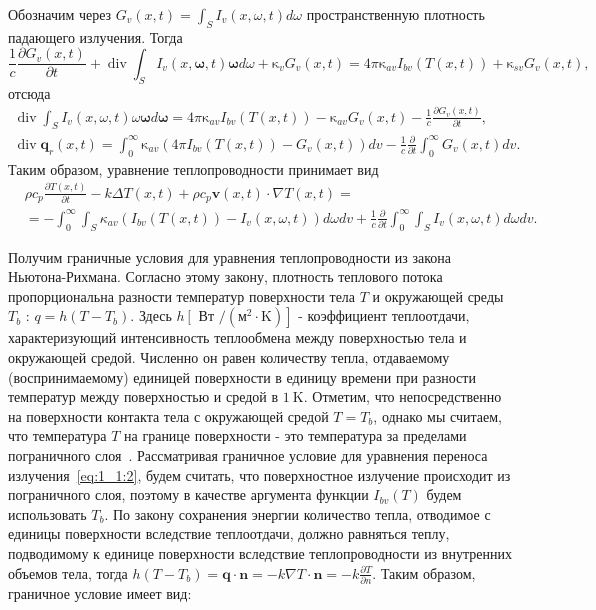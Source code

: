 Обозначим через $G_{v}(x, t)=\int_{S} I_{v}(x, \omega, t) d \omega$
пространственную плотность падающего излучения.
Тогда
\[
    \frac{1}{c} \frac{\partial G_{v}(x, t)}{\partial t}
    +\operatorname{div} \int_{S} I_{v}(x, \boldsymbol{\omega}, t)
    \boldsymbol{\omega} d \omega+\mathrm{\kappa}_{v} G_{v}(x, t)=4 \pi
    \mathrm{\kappa}_{a v} I_{b v}(T(x, t))+\mathrm{\kappa}_{s v} G_{v}(x, t),
\]
отсюда
\[
    \begin{gathered}
        \operatorname{div} \int_{S} I_{v}(x, \omega, t) \omega \boldsymbol{\omega} d
        \boldsymbol{\omega}=4 \pi \mathrm{\kappa}_{a v} I_{b v}(T(x, t))-\mathrm{\kappa}_{a v}
        G_{v}(x, t)-\frac{1}{c} \frac{\partial G_{v}(x, t)}{\partial t}, \\
        \operatorname{div} \mathbf{q}_{r}(x, t)=\int_{0}^{\infty} \mathrm{\kappa}_{a v}
        \left(4 \pi I_{b v}(T(x, t))-G_{v}(x, t)\right) d v-\frac{1}{c}
        \frac{\partial}{\partial t} \int_{0}^{\infty} G_{v}(x, t) d v.
    \end{gathered}
\]
Таким образом, уравнение теплопроводности принимает вид
\[
    \begin{aligned}
        &\rho c_{p} \frac{\partial T(x, t)}{\partial t}
        -k \Delta T(x, t)+\rho c_{p} \mathbf{v}(x, t) \cdot \nabla T(x, t)= \\
        &=-\int_{0}^{\infty} \int_{S} \kappa_{a v}
        \left(I_{b v}(T(x, t))-I_{v}(x, \omega, t)\right) d \omega d v
        +\frac{1}{c} \frac{\partial}{\partial t}
        \int_{0}^{\infty} \int_{S} I_{v}(x, \omega, t) d \omega d v.
    \end{aligned}
\]

Получим граничные условия для уравнения теплопроводности из закона Ньютона-Рихмана.
Согласно этому закону, плотность теплового потока пропорциональна разности температур
поверхности тела $T$ и окружающей среды $T_{b}$ : $q=h\left(T-T_{b}\right)$.
Здесь $h\left[\right.$ Вт $\left./\left(\mathrm{м}^{2} \cdot \mathrm{K}\right)\right]$ - коэффициент
теплоотдачи, характеризующий интенсивность теплообмена между поверхностью тела и окружающей средой.
Численно он равен количеству тепла, отдаваемому (воспринимаемому) единицей поверхности в единицу времени
при разности температур между поверхностью и средой в $1 \mathrm{~K}$.
Отметим, что непосредственно
на поверхности контакта тела с окружающей средой $T=T_{b}$,
однако мы считаем, что температура $T$ на
границе поверхности - это температура за пределами пограничного слоя~\cite{Mazo}.
Рассматривая граничное условие для уравнения переноса излучения~\eqref{eq:1_1:2},
будем считать, что поверхностное излучение происходит из пограничного слоя,
поэтому в качестве аргумента функции $I_{b v}(T)$ будем использовать $T_{b}$.
По закону сохранения энергии количество тепла, отводимое с единицы поверхности
вследствие теплоотдачи, должно равняться теплу, подводимому к единице поверхности
вследствие теплопроводности из внутренних объемов тела, тогда
$h\left(T-T_{b}\right)=\mathbf{q} \cdot \mathbf{n} =
-k \nabla T \cdot \mathbf{n}=-k \frac{\partial T}{\partial n}$.
Таким образом, граничное условие имеет вид:

